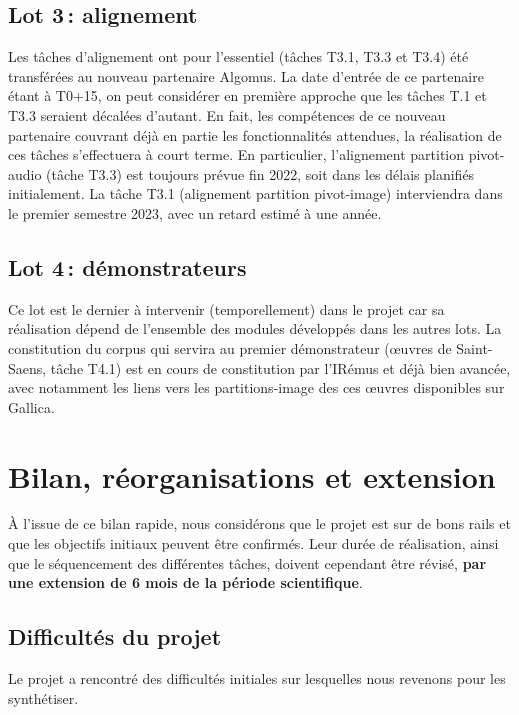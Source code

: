 \documentclass[11pt]{article}
\begin{document}
\subsection{Lot 3\,: alignement}

Les tâches d'alignement ont pour l'essentiel (tâches T3.1, T3.3 et T3.4) été transférées au nouveau partenaire Algomus. 
La date d'entrée de ce partenaire étant à T0+15, on peut considérer en première approche que
les tâches T.1 et T3.3 seraient décalées d'autant. En fait, les compétences de ce nouveau partenaire 
couvrant déjà en  partie les fonctionnalités attendues, la réalisation de ces tâches
s'effectuera à court terme. En particulier, l'alignement partition pivot-audio (tâche T3.3) est toujours
prévue fin 2022, soit dans les délais planifiés initialement. La tâche T3.1 
(alignement partition pivot-image) interviendra dans le premier semestre 2023, avec un 
retard estimé à une année.

\subsection{Lot 4\,: démonstrateurs}

Ce lot est le dernier à intervenir  (temporellement) dans le projet car sa réalisation 
dépend de l'ensemble des modules développés dans les autres lots. La constitution du corpus 
qui servira au premier démonstrateur (œuvres de Saint-Saens, tâche T4.1) est en cours de constitution
par l'IRémus et déjà bien avancée, avec notamment les liens vers les partitions-image
des ces œuvres disponibles sur Gallica. 

\section{Bilan, réorganisations et extension}\label{sec:bilan}

À l'issue de ce bilan rapide, nous considérons que le projet est sur de bons rails
et que les objectifs initiaux peuvent être confirmés. Leur 
durée de réalisation, ainsi que le séquencement des différentes tâches, doivent 
cependant être révisé, \textbf{par une extension de 6 mois de
la période scientifique}. 

\subsection{Difficultés du projet}

Le projet a rencontré des difficultés initiales sur lesquelles nous revenons
pour les synthétiser.
 
\end{document}
